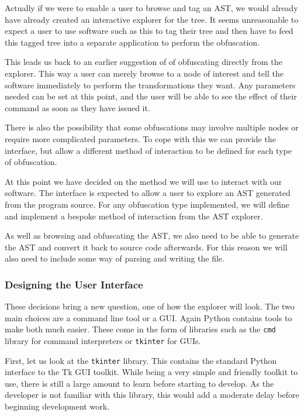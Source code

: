 \documentclass{report}
\begin{document}
Actually if we were to enable a user to browse and tag an AST, we would already have already created an interactive explorer for
the tree. It seems unreasonable to expect a user to use software such as this to tag their tree and then have to feed this tagged
tree into a separate application to perform the obfuscation.

This leads us back to an earlier suggestion of of obfuscating directly from the explorer. This way
a user can merely browse to a node of interest and tell the software immediately to perform the transformations they want. Any
parameters needed can be set at this point, and the user will be able to see the effect of their command as soon as they have issued
it.

There is also the possibility that some obfuscations may involve multiple nodes or require more complicated parameters. To cope with
this we can provide the interface, but allow a different method of interaction to be defined for each type of obfuscation.

At this point we have decided on the method we will use to interact with our software. The interface is expected to allow a user to
explore an AST generated from the program source. For any obfuscation type implemented, we will define and implement a bespoke method
of interaction from the AST explorer.

As well as browsing and obfuscating the AST, we also need to be able to generate the AST and convert it back to source code afterwards.
For this reason we will also need to include some way of parsing and writing the file.

\subsubsection{Designing the User Interface}

These decisions bring a new question, one of how the explorer will look. The two main choices are a command line tool or a GUI. Again
Python contains tools to make both much easier. These come in the form of libraries such as the \texttt{cmd} library \cite{pycmd} for command
interpreters or \texttt{tkinter} \cite{pytkinter} for GUIs.

First, let us look at the \texttt{tkinter} library. This contains the standard Python interface to the Tk GUI toolkit. While being
a very simple and friendly toolkit to use, there is still a large amount to learn before starting to develop. As the developer is
not familiar with this library, this would add a moderate delay before beginning development work.
\end{document}
